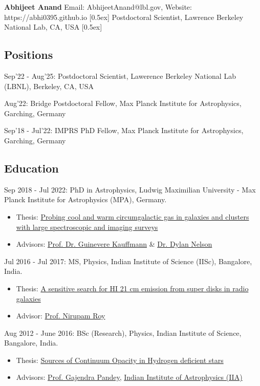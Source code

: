 \documentclass[12pt,letterpaper]{article}
\begin{document}
\thispagestyle{empty}\sloppy\sloppypar\raggedbottom

\textbf{\Large Abhijeet Anand} \hfill
\textsf{\small Email: AbhijeetAnand@lbl.gov, Website: https://abhi0395.github.io}   [0.5ex]
Postdoctoral Scientist, Lawrence Berkeley National Lab, CA, USA  [0.5ex]

\subsection{Positions}
\begin{list}{}{\cvlist}
\item
Sep'22 - Aug'25: Postdoctoral Scientist, Lawerence Berkeley National Lab (LBNL), Berkeley, CA, USA
\item
Aug'22: Bridge Postdoctoral Fellow, Max Planck Institute for Astrophysics, Garching, Germany
\item
Sep'18 - Jul'22: IMPRS PhD Fellow, Max Planck Institute for Astrophysics, Garching, Germany
\end{list}

\subsection{Education}
\begin{list}{}{\cvlist}
  \item Sep 2018 - Jul 2022: PhD in Astrophysics, Ludwig Maximilian University - Max Planck Institute for Astrophysics (MPA), Germany.
\begin{itemize}
    \item Thesis: \href{https://edoc.ub.uni-muenchen.de/30337/}{Probing cool and warm circumgalactic gas in galaxies and clusters with large spectroscopic and imaging surveys}
    \item Advisors: \href{https://www.mpa-garching.mpg.de/galaxyformation}{Prof. Dr. Guinevere Kauffmann} \& \href{https://www.ita.uni-heidelberg.de/~dnelson/}{Dr. Dylan Nelson}
\end{itemize}

\item Jul 2016 - Jul 2017: MS, Physics, Indian Institute of Science (IISc), Bangalore, India.
\begin{itemize}
    \item Thesis: \href{/files/MS_thesis.pdf}{A sensitive search for HI 21 cm emission from super disks in radio galaxies}
    \item Advisor: \href{http://www.physics.iisc.ernet.in/%7Enroy/}{Prof. Nirupam Roy}
  \end{itemize}
\item Aug 2012 - June 2016: BSc (Research), Physics, Indian Institute of Science, Bangalore, India.
\begin{itemize}
    \item Thesis: \href{/files/BS_thesis.pdf}{Sources of Continuum Opacity in Hydrogen deficient stars}
    \item Advisors: \href{https://www.iiap.res.in/?q=user/29}{Prof. Gajendra Pandey}, \href{https://www.iiap.res.in/}{Indian Institute of Astrophysics (IIA)}
  \end{itemize}
\end{list}
\end{document}
